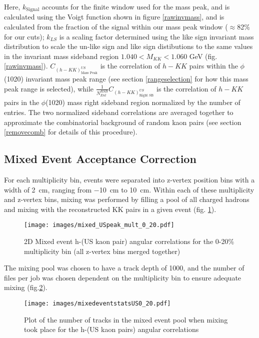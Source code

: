 \documentclass[ALICE,manyauthors]{ALICE_analysis_notes}
\begin{document}
Here, $k_{\text{Signal}}$ accounts for the finite window used for the mass peak, and is calculated using the Voigt function shown in figure \ref{rawinvmass}, and is calculated from the fraction of the signal within our mass peak window ($\approx$82\% for our cuts); $k_{LS}$ is a scaling factor determined using the like sign invariant mass distribution to scale the un-like sign and like sign distibutions to the same values in the invariant mass sideband region $1.040 < M_{KK} < 1.060$ GeV (fig. \ref{rawinvmass}). $C_{(h-KK)^{US}_{\text{Mass Peak}}}$ is the correlation of $h-KK$ pairs within the $\phi$(1020) invariant mass peak range (see section \ref{rangeselection} for how this mass peak range is selected), while $\frac{1}{N_{Ent}^{RSB}}C_{(h-KK)^{US}_{\text{Right SB}}}$ is the correlation of $h-KK$ pairs in the $\phi$(1020) mass right sideband region normalized by the number of entries.  The two normalized sideband correlations are averaged together to approximate the combinatorial background of random kaon pairs (see section \ref{removecomb} for details of this procedure).

\subsection{Mixed Event Acceptance Correction}

For each multiplicity bin, events were separated into z-vertex position bins with a width of \SI{2}{cm}, ranging from \SI{-10}{cm} to \SI{10}{cm}.  Within each of these multiplicity and z-vertex bins, mixing was performed by filling a pool of all charged hadrons and mixing with the reconstructed KK pairs in a given event (fig. \ref{mix2D}).

\begin{figure}[ht]
\centering
\texttt{[image: images/mixed\_USpeak\_mult\_0\_20.pdf]}
\caption{2D Mixed event h-(US kaon pair) angular correlations for the 0-20\% multiplicity bin (all z-vertex bins merged together) }
\label{mix2D}
\end{figure}

The mixing pool was chosen to have a track depth of 1000, and the number of files per job was chosen dependent on the multiplicity bin to ensure adequate mixing (fig.\ref{mixstatUS}).


\begin{figure}[ht]
\centering
\texttt{[image: images/mixedeventstatsUS0\_20.pdf]}
\caption{Plot of the number of tracks in the mixed event pool when mixing took place for the h-(US kaon pairs) angular correlations}
\label{mixstatUS}
\end{figure}
\end{document}
